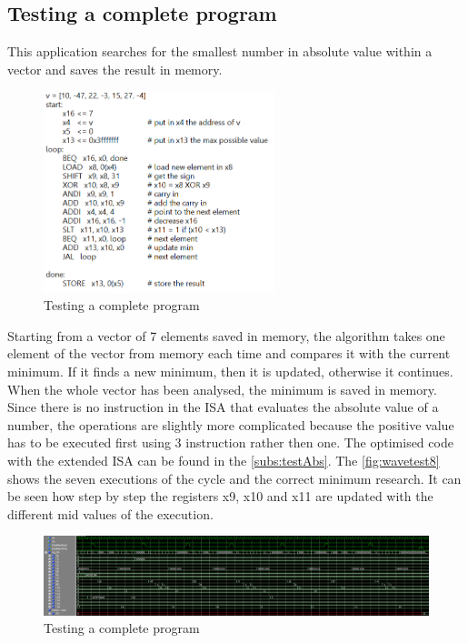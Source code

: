 \subsection{Testing a complete program}
This application searches for the smallest number in absolute value within a vector and saves the result in memory.
\begin{figure}[H]
	\centering
	\includegraphics[width=0.6\textwidth]{sec3/images/test8.png}
	\caption{Testing a complete program}
	\label{fig:test8}
\end{figure}
\noindent Starting from a vector of 7 elements saved in memory, the algorithm takes one element of the vector from memory each time and compares it with the current minimum. If it finds a new minimum, then it is updated, otherwise it continues. When the whole vector has been analysed, the minimum is saved in memory. Since there is no instruction in the ISA that evaluates the absolute value of a number, the operations are slightly more complicated because the positive value has to be executed first using 3 instruction rather then one. The optimised code with the extended ISA can be found in the \autoref{subs:testAbs}.
The \autoref{fig:wavetest8} shows the seven executions of the cycle and the correct minimum research. It can be seen how step by step the registers x9, x10 and x11 are updated with the different mid values of the execution.
\begin{figure}[H]
	\centering
	\includegraphics[width=1\textwidth]{sec3/images/wave_test8_1.png}
	\caption{Testing a complete program}
	\label{fig:wavetest8}
\end{figure}

